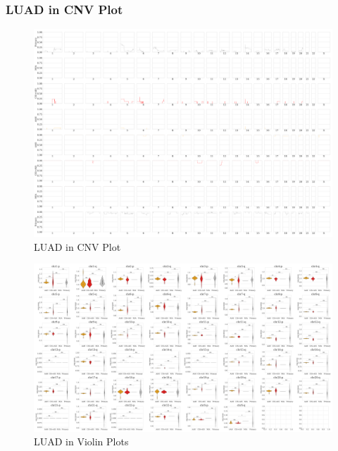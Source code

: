 \documentclass{beamer}
\begin{document}
    \begin{frame}[allowframebreaks]
        \frametitle{LUAD in CNV Plot}

        \begin{figure}
            \includegraphics[width=0.6 \linewidth]{figures/PureCN/BWA-simple-ADC.pdf}
            \caption{LUAD in CNV Plot}
        \end{figure}

        \begin{figure}
            \includegraphics[width=0.8 \linewidth]{figures/PureCN/BWA-violin-ADC.pdf}
            \caption{LUAD in Violin Plots}
        \end{figure}
    \end{frame}
\end{document}
